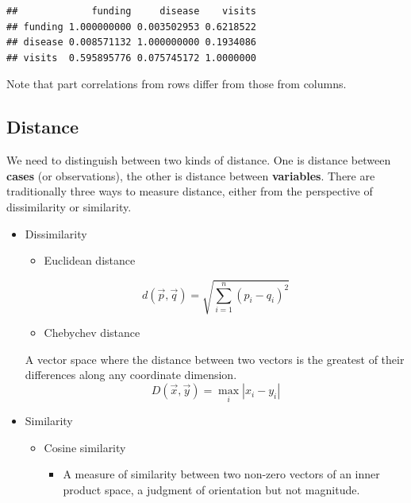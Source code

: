 \documentclass[
]{ctexart}
\providecommand{\tightlist}{%
  \setlength{\itemsep}{0pt}\setlength{\parskip}{0pt}}
\begin{document}
\begin{verbatim}
##             funding     disease    visits
## funding 1.000000000 0.003502953 0.6218522
## disease 0.008571132 1.000000000 0.1934086
## visits  0.595895776 0.075745172 1.0000000
\end{verbatim}

Note that part correlations from rows differ from those from columns.

\hypertarget{distance}{%
\subsection{Distance}\label{distance}}

We need to distinguish between two kinds of distance. One is distance
between \textbf{cases} (or observations), the other is distance between
\textbf{variables}. There are traditionally three ways to measure
distance, either from the perspective of dissimilarity or similarity.

\begin{itemize}
\tightlist
\item
  Dissimilarity

  \begin{itemize}
  \tightlist
  \item
    Euclidean distance
  \end{itemize}

  \[d(\vec p,\vec q)=\sqrt{\sum_{i=1}^n(p_i-q_i)^2}\]

  \begin{itemize}
  \tightlist
  \item
    Chebychev distance
  \end{itemize}

  A vector space where the distance between two vectors is the greatest
  of their differences along any coordinate dimension.
  \[D(\vec x,\vec y)=\max_i|x_i-y_i|\]
\item
  Similarity

  \begin{itemize}
  \tightlist
  \item
    Cosine similarity

    \begin{itemize}
    \tightlist
    \item
      A measure of similarity between two non-zero vectors of an inner
      product space, a judgment of orientation but not magnitude.
    \end{itemize}
  \end{itemize}
\end{itemize}
\end{document}
